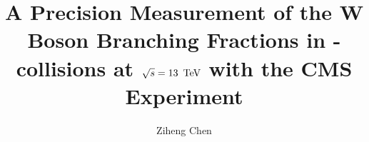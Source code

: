 \documentclass[12pt,reqno]{nuthesis}
\author{Ziheng Chen}
\title{A Precision Measurement of the W Boson Branching Fractions in \Pp-\Pp collisions at $\sqrt{s} = 13~\,\text{Te\hspace{-.08em}V}$ with the CMS Experiment}
\begin{document}
    
    
    


    \mainmatter  
    
    
    
    
    
    
    
    
    
    
    
    \begin{appendix}
    
    \end{appendix}


    \begin{singlespace}
    
    
    \end{singlespace}
    
    
\end{document}
